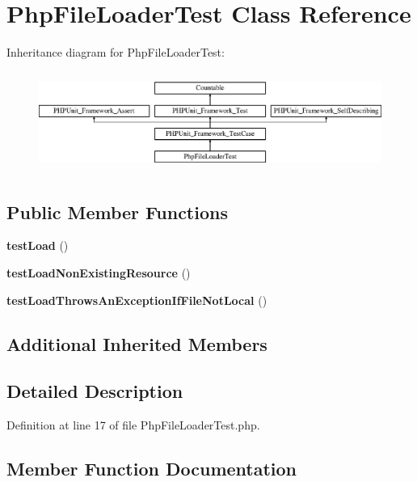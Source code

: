 \section{Php\+File\+Loader\+Test Class Reference}
\label{class_symfony_1_1_component_1_1_translation_1_1_tests_1_1_loader_1_1_php_file_loader_test}
Inheritance diagram for Php\+File\+Loader\+Test\+:\begin{figure}[H]
\begin{center}
\leavevmode
\includegraphics[height=3.303835cm]{class_symfony_1_1_component_1_1_translation_1_1_tests_1_1_loader_1_1_php_file_loader_test}
\end{center}
\end{figure}
\subsection*{Public Member Functions}
\begin{DoxyCompactItemize}
\item 
{\bf test\+Load} ()
\item 
{\bf test\+Load\+Non\+Existing\+Resource} ()
\item 
{\bf test\+Load\+Throws\+An\+Exception\+If\+File\+Not\+Local} ()
\end{DoxyCompactItemize}
\subsection*{Additional Inherited Members}


\subsection{Detailed Description}


Definition at line 17 of file Php\+File\+Loader\+Test.\+php.



\subsection{Member Function Documentation}

